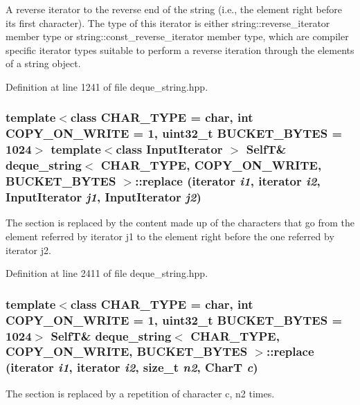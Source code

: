 A reverse iterator to the reverse end of the string (i.e., the element right before its first character). The type of this iterator is either string::reverse\_\-iterator member type or string::const\_\-reverse\_\-iterator member type, which are compiler specific iterator types suitable to perform a reverse iteration through the elements of a string object. 

Definition at line 1241 of file deque\_\-string.hpp.\hypertarget{classdeque__string_ff80cea2a38afc2b7200c8bc4358e5c5}{
\subsubsection[{replace}]{\setlength{\rightskip}{0pt plus 5cm}template$<$class CHAR\_\-TYPE  = char, int COPY\_\-ON\_\-WRITE = 1, uint32\_\-t BUCKET\_\-BYTES = 1024$>$ template$<$class InputIterator $>$ {\bf SelfT}\& {\bf deque\_\-string}$<$ CHAR\_\-TYPE, COPY\_\-ON\_\-WRITE, BUCKET\_\-BYTES $>$::replace (iterator {\em i1}, \/  iterator {\em i2}, \/  InputIterator {\em j1}, \/  InputIterator {\em j2})}}
\label{classdeque__string_ff80cea2a38afc2b7200c8bc4358e5c5}


The section is replaced by the content made up of the characters that go from the element referred by iterator j1 to the element right before the one referred by iterator j2. 

Definition at line 2411 of file deque\_\-string.hpp.\hypertarget{classdeque__string_798d6054dc0ae68df66899275d199c31}{
\subsubsection[{replace}]{\setlength{\rightskip}{0pt plus 5cm}template$<$class CHAR\_\-TYPE  = char, int COPY\_\-ON\_\-WRITE = 1, uint32\_\-t BUCKET\_\-BYTES = 1024$>$ {\bf SelfT}\& {\bf deque\_\-string}$<$ CHAR\_\-TYPE, COPY\_\-ON\_\-WRITE, BUCKET\_\-BYTES $>$::replace (iterator {\em i1}, \/  iterator {\em i2}, \/  size\_\-t {\em n2}, \/  CharT {\em c})}}
\label{classdeque__string_798d6054dc0ae68df66899275d199c31}


The section is replaced by a repetition of character c, n2 times. 

